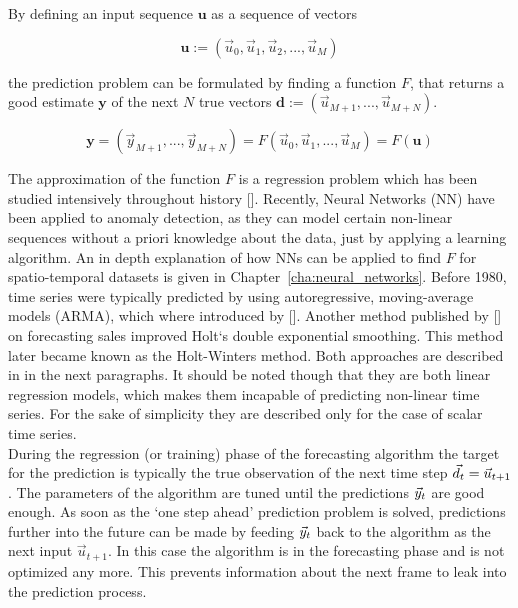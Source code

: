 By defining an input sequence $\textbf{u}$ as a sequence of vectors

\begin{equation}
  \textbf{u} := (\vec{u}_0, \vec{u}_1, \vec{u}_2, ..., \vec{u}_M)
\end{equation}

the prediction problem can be formulated by finding a function $F$, that
returns a good estimate $\textbf{y}$ of the next $N$ true vectors $\textbf{d}
:= (\vec{u}_{M+1}, ..., \vec{u}_{M+N})$.

\begin{equation}
  \textbf{y} = (\vec{y}_{M+1}, ..., \vec{y}_{M+N}) 
             = F(\vec{u}_0, \vec{u}_1, ..., \vec{u}_M)
             = F(\textbf{u})
\end{equation}

The approximation of the function $F$ is a regression problem which has
been studied intensively throughout history [\cite{narx_prediction}].
Recently, Neural Networks (NN) have been applied to anomaly detection, as they
can model certain non-linear sequences without a priori knowledge about the
data, just by applying a learning algorithm. An in depth explanation of how NNs
can be applied to find $F$ for spatio-temporal datasets is given in
Chapter~\ref{cha:neural_networks}.  Before 1980, time series were typically
predicted by using autoregressive, moving-average models (ARMA), which where
introduced by [\cite{boxjenkins}].  Another method published by
[\cite{winters1960forecasting}] on forecasting sales improved Holt`s double
exponential smoothing.  This method later became known as the Holt-Winters
method.  Both approaches are described in in the next paragraphs.  It should be
noted though that they are both linear regression models, which makes them
incapable of predicting non-linear time series. For the sake of simplicity they
are described only for the case of scalar time series.\\

During the regression (or training) phase of the forecasting algorithm the
target for the prediction is typically the true observation of the next time
step $\vec{d}_t = \vec{u}_{t+1}$.  The parameters of the algorithm are tuned until
the predictions $\vec{y}_t$ are good enough.  As soon as the `one step ahead'
prediction problem is solved, predictions further into the future can be made
by feeding $\vec{y}_t$ back to the algorithm as the next input $\vec{u}_{t+1}$. In
this case the algorithm is in the forecasting phase and is not optimized
any more. This prevents information about the next frame to leak into the
prediction process.

